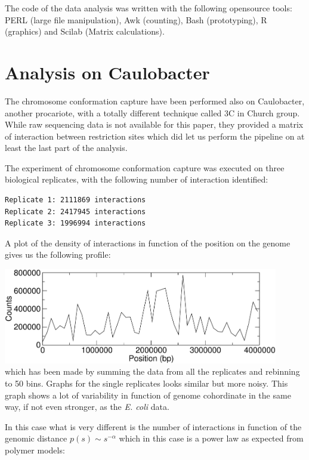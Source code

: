 \documentclass[12pt,a4paper,notitlepage]{article}
\newcommand{\ecoli}{\emph{E. coli}\xspace}
\begin{document}
The code of the data analysis was written with the following
opensource tools: PERL (large file manipulation), Awk (counting),
Bash (prototyping), R (graphics) and Scilab (Matrix calculations).

\section{Analysis on Caulobacter}

The chromosome conformation capture have been performed also on
Caulobacter, another procariote, with a totally different technique
called 3C\cite{Umbarger2011} in Church group. While raw sequencing
data is not available for this paper, they provided a matrix of
interaction between restriction sites which did let us perform the
pipeline on at least the last part of the analysis.

The experiment of chromosome conformation capture was executed on
three biological replicates, with the following number of interaction
identified:
\begin{verbatim}
Replicate 1: 2111869 interactions
Replicate 2: 2417945 interactions
Replicate 3: 1996994 interactions
\end{verbatim}

A plot of the density of interactions in function of the position on
the genome gives us the following profile:

\vspace{.5cm}\hspace{2cm}\includegraphics[page=1,width=12cm]{genocaulo}\\
which has been made by summing the data from all the
replicates and rebinning to 50 bins. Graphs for the single replicates
looks similar but more noisy. This graph shows a lot of variability in
function of genome cohordinate in the same way, if not even stronger,
as the \ecoli data.

In this case what is very different is the number of interactions in
function of the genomic distance $p(s) \sim s^{-\alpha}$ which in
this case is a power law as expected from polymer models:
\end{document}
